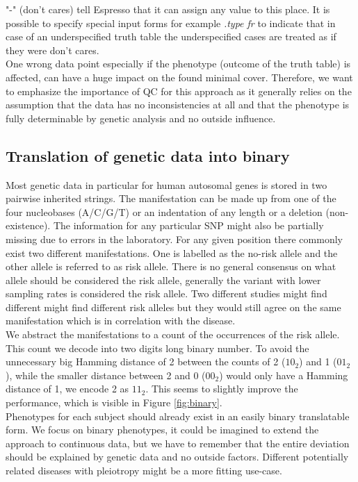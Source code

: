 \documentclass[letterpaper, 11pt]{article}
\begin{document}
"-" (don't cares) tell Espresso that it can assign any value to this place. It is possible to specify special input forms for example  \emph{.type fr} to indicate that in case of an underspecified truth table the underspecified cases are treated as if they were don't cares. \\

One wrong data point especially if the phenotype (outcome of the truth table) is affected, can have a huge impact on the found minimal cover. Therefore, we want to emphasize the importance of  QC for this approach as it generally relies on the assumption that the data has no inconsistencies at all and that the phenotype is fully determinable by genetic analysis and no outside influence. 

\subsection{Translation of genetic data into binary}
\label{sec:encode}
Most genetic data in particular for human autosomal genes is stored in two pairwise inherited strings. The manifestation can be made up from one of the four nucleobases (A/C/G/T) or an indentation of any length or a deletion (non-existence). The information for any particular SNP might also be partially missing due to errors in the laboratory. For any given position there commonly exist two different manifestations. One is labelled as the no-risk allele and the other allele is referred to as risk allele. There is no general consensus on what allele should be considered the risk allele, generally the variant with lower sampling rates is considered the risk allele. Two different studies might find different might find different risk alleles but they would still agree on the same manifestation which is in correlation with the disease. \\


We abstract the manifestations to a count of the occurrences of the risk allele. This count we decode into two digits long binary number. To avoid the unnecessary big Hamming distance of 2 between the counts of 2 ($10_2$) and 1 ($01_2$), while the smaller distance between 2 and 0 ($00_2$) would only have a Hamming distance of 1, we encode 2 as $11_2$. This seems to slightly improve the performance, which is visible in Figure \ref{fig:binary}.\\

Phenotypes for each subject should already exist in an easily binary translatable form. We focus on binary phenotypes, it could be imagined to extend the approach to continuous data, but we have to remember that the entire deviation should be explained by genetic data and no outside factors. Different potentially related diseases with pleiotropy might be a more fitting use-case.
\end{document}
